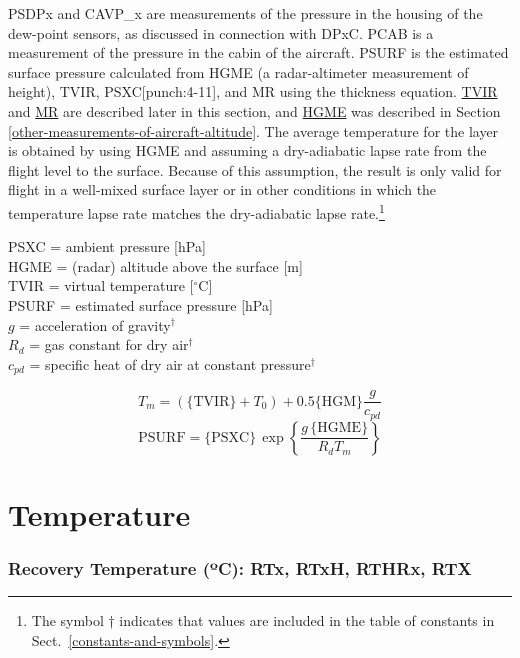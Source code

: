 \documentclass[
  english,
]{book}
\begin{document}
PSDPx and CAVP\_x are measurements of the pressure in the housing of the dew-point sensors, as discussed in connection with DPxC. PCAB is a measurement of the pressure in the cabin of the aircraft. PSURF is the estimated surface pressure calculated from HGME (a radar-altimeter measurement of height), TVIR, PSXC\protect\hypertarget{punch:4-11}{}{{[}punch:4-11{]}}, and MR using the thickness equation. \protect\hyperlink{TVIR}{TVIR} and \protect\hyperlink{MR}{MR} are described later in this section, and \protect\hyperlink{HGME}{HGME} was described in Section \ref{other-measurements-of-aircraft-altitude}. The average temperature for the layer is obtained by using HGME and assuming a dry-adiabatic lapse rate from the flight level to the surface. Because of this assumption, the result is only valid for flight in a well-mixed surface layer or in other conditions in which the temperature lapse rate matches the dry-adiabatic lapse rate.\footnote{The symbol {†} indicates that values are included in the table of constants in Sect.~\ref{constants-and-symbols}.}

PSXC = ambient pressure {[}hPa{]}\\
HGME = (radar) altitude above the surface {[}m{]}\\
TVIR = virtual temperature {[}\(^{\circ}\mathrm{C}\){]}\\
PSURF = estimated surface pressure {[}hPa{]}\\
\(g\) = acceleration of gravity\(^{\dagger}\)\\
\(R_{d}\) = gas constant for dry air\(^{\dagger}\)\\
\(c_{pd}\) = specific heat of dry air at constant pressure\(^{\dagger}\)

\begin{equation}
T_{m}=(\mathrm{\{TVIR\}}+T_{0})+0.5\mathrm{\{HGM\}}\frac{g}{c_{pd}}
\label{eq:Tm4PSURF}
\end{equation}
\begin{equation}
\mathrm{PSURF}=\mathrm{\{PSXC\}}\,\exp\left\{ \frac{g\,\{\mathrm{HGME}\}}{R_{d}T_{m}}\right\}
\label{eq:PSURF}
\end{equation}

\hypertarget{temperature-section}{%
\section{Temperature}\label{temperature-section}}

\hypertarget{recovery-t}{%
\subsubsection*{\texorpdfstring{Recovery Temperature ({º}C): RTx, RTxH, RTHRx, RTX}{Recovery Temperature (ºC): RTx, RTxH, RTHRx, RTX}}\label{recovery-t}}
\end{document}
